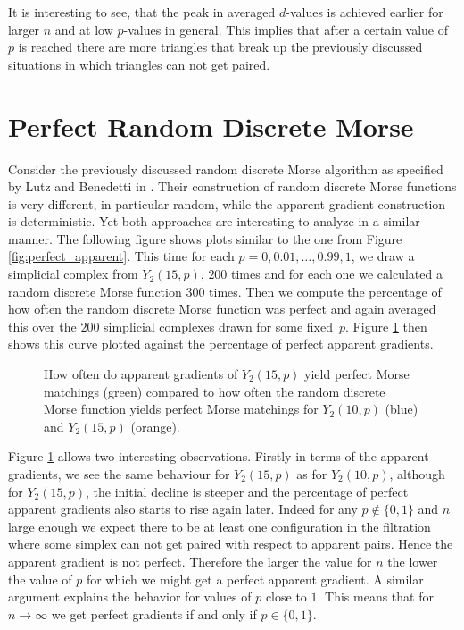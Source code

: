 It is interesting to see, that the peak in averaged $d$-values is achieved earlier for larger $n$ and at low $p$-values in general. This implies that after a certain value of $p$ is reached there are more triangles that break up the previously discussed situations in which triangles can not get paired.

\section{Perfect Random Discrete Morse}
Consider the previously discussed random discrete Morse algorithm as specified by Lutz and Benedetti in \cite{lutzbenedetti}. Their construction of random discrete Morse functions is very different, in particular random, while the apparent gradient construction is deterministic. Yet both approaches are interesting to analyze in a similar manner. The following figure shows plots similar to the one from Figure \ref{fig:perfect_apparent}. This time for each $p = 0,0.01,\dots,0.99,1$, we draw a simplicial complex from $Y_2(15,p)$, $200$ times and for each one we calculated a random discrete Morse function $300$ times. Then we compute the percentage of how often the random discrete Morse function was perfect and again averaged this over the $200$ simplicial complexes drawn for some fixed~$p$. Figure \ref{fig:perfect_rdm_v_apparent} then shows this curve plotted against the percentage of perfect apparent gradients.


\begin{figure}[H]
\begin{subfigure}[c]{0.95\textwidth}
\begin{center}

\end{center}
\end{subfigure}
\caption{How often do apparent gradients of  $Y_2(15,p)$ yield perfect Morse matchings (green) compared to how often the random discrete Morse function yields perfect Morse matchings for $Y_2(10,p)$ (blue) and $Y_2(15,p)$ (orange).}
\label{fig:perfect_rdm_v_apparent}
\end{figure}

Figure \ref{fig:perfect_rdm_v_apparent} allows two interesting observations. Firstly in terms of the apparent gradients, we see the same behaviour for $Y_2(15,p)$ as for $Y_2(10,p)$, although for $Y_2(15,p)$, the initial decline is steeper and the percentage of perfect apparent gradients also starts to rise again later. Indeed for any $p \notin \{0,1\}$ and $n$ large enough we expect there to be at least one configuration in the filtration where some simplex can not get paired with respect to apparent pairs. Hence the apparent gradient is not perfect. Therefore the larger the value for $n$ the lower the value of $p$ for which we might get a perfect apparent gradient. A similar argument explains the behavior for values of $p$ close to $1$. This means that for $n \rightarrow \infty$ we get perfect gradients if and only if $p \in \{0,1\}$.

